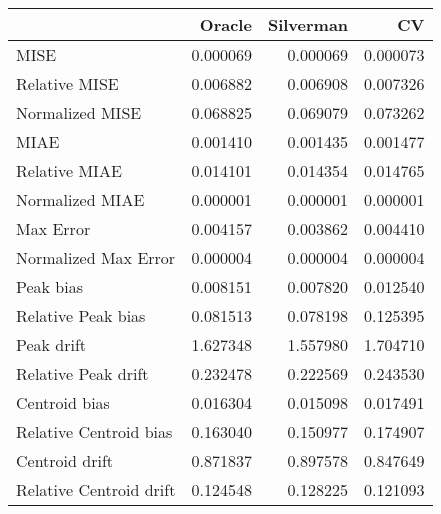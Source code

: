 \begin{tabular}{lrrr}
  \hline
 & Oracle & Silverman & CV \\ 
  \hline
MISE & 0.000069 & 0.000069 & 0.000073 \\ 
  Relative MISE & 0.006882 & 0.006908 & 0.007326 \\ 
  Normalized MISE & 0.068825 & 0.069079 & 0.073262 \\ 
  MIAE & 0.001410 & 0.001435 & 0.001477 \\ 
  Relative MIAE & 0.014101 & 0.014354 & 0.014765 \\ 
  Normalized MIAE & 0.000001 & 0.000001 & 0.000001 \\ 
  Max Error & 0.004157 & 0.003862 & 0.004410 \\ 
  Normalized Max Error & 0.000004 & 0.000004 & 0.000004 \\ 
  Peak bias & 0.008151 & 0.007820 & 0.012540 \\ 
  Relative Peak bias & 0.081513 & 0.078198 & 0.125395 \\ 
  Peak drift & 1.627348 & 1.557980 & 1.704710 \\ 
  Relative Peak drift & 0.232478 & 0.222569 & 0.243530 \\ 
  Centroid bias & 0.016304 & 0.015098 & 0.017491 \\ 
  Relative Centroid bias & 0.163040 & 0.150977 & 0.174907 \\ 
  Centroid drift & 0.871837 & 0.897578 & 0.847649 \\ 
  Relative Centroid drift & 0.124548 & 0.128225 & 0.121093 \\ 
   \hline
\end{tabular}
